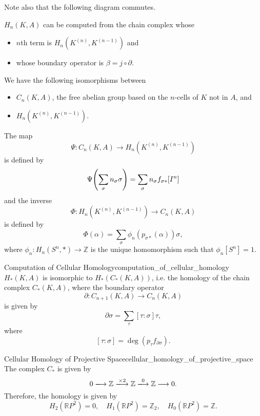 \documentclass{article}
\begin{document}
Note also that the following diagram commutes.
\begin{center}
\end{center}

$H_n(K,A)$ can be computed from the chain complex whose
\begin{itemize}
    \item $n$th term is $H_n(K^{(n )}, K^{(n-1)})$ and
    \item whose boundary operator is $\beta = j \circ \partial$.
\end{itemize}

We have the following isomorphisms between
\begin{itemize}
    \item $C_n(K,A)$, the free abelian group based on the $n$-cells of $K$ not in $A$, and
    \item $H_n(K^{(n )}, K^{(n-1)})$.
\end{itemize}
The map
\[ \Psi: C_n(K,A) \rightarrow H_n(K^{(n )}, K^{(n-1)}) \]
is defined by
\[ \Psi\qty(\sum_\sigma n_\sigma \sigma) = \sum_\sigma n_\sigma f_{\sigma *}[I^n] \]
and the inverse
\[ \Phi: H_n(K^{(n )}, K^{(n-1)}) \rightarrow C_n(K,A) \]
is defined by
\[ \Phi(\alpha) = \sum_\sigma \phi_n(p_{\sigma *}(\alpha)) \sigma, \]
where $\phi_n: H_n(S^n,*) \rightarrow \mathbb{Z}$ is the unique homomorphism such that $\phi_n[S^n] = 1$.

\begin{theorem}{Computation of Cellular Homology}{computation_of_cellular_homology}
    $H_*(K,A)$ is isomorphic to $H_*(C_*(K,A))$, i.e. the homology of the chain complex $C_*(K,A)$, where the boundary operator
    \[ \partial: C_{n+1}(K,A) \rightarrow C_n(K,A) \]
    is given by
    \[ \partial \sigma = \sum_\tau [\tau:\sigma] \tau, \]
    where
    \[ [\tau:\sigma] = \operatorname{deg}(p_\tau f_{\partial \sigma}). \]
\end{theorem}

\begin{example}{Cellular Homology of Projective Space}{cellular_homology_of_projective_space}
    The complex $C_*$ is given by
    \[ 0 \xlongrightarrow{} \mathbb{Z} \xlongrightarrow{\times 2} \mathbb{Z} \xlongrightarrow{0} \mathbb{Z} \longrightarrow 0. \]
    Therefore, the homology is given by
    \[ H_2(\mathbb{R}P^2) = 0,\quad H_1(\mathbb{R}P^2) = \mathbb{Z}_2,\quad H_0(\mathbb{R}P^2) = \mathbb{Z}. \]
\end{example}
\end{document}
